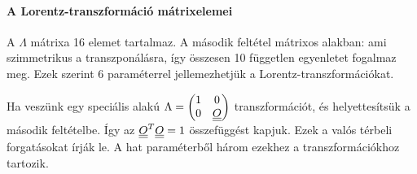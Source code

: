    \paragraph{A Lorentz-transzformáció mátrixelemei}
    
    A $\Lambda$ mátrixa 16 elemet tartalmaz. A második feltétel mátrixos alakban:
    ami szimmetrikus a transzponálásra, így összesen 10 független egyenletet fogalmaz meg. Ezek szerint 6 paraméterrel jellemezhetjük a Lorentz-transzformációkat. 
    
    Ha veszünk egy speciális alakú 
    $\Lambda=\begin{pmatrix}
              1 & 0 \\
              0 & \underline{\underline{O}}
             \end{pmatrix}$
    transzformációt, és helyettesítsük a második feltételbe. Így az $\underline{\underline{O}}^T\underline{\underline{O}}=1$ összefüggést kapjuk. Ezek a valós térbeli forgatásokat írják le. A hat paraméterből három ezekhez a transzformációkhoz tartozik.
    
